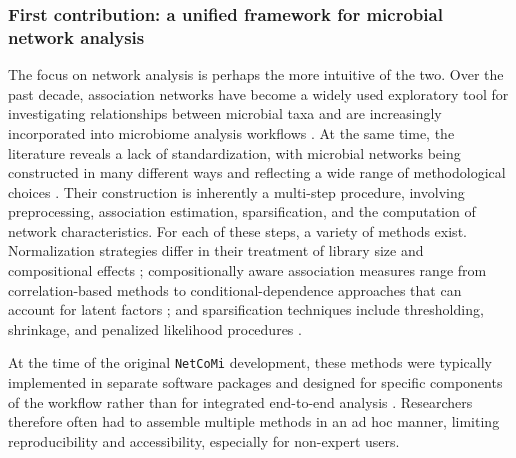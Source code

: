 \subsubsection*{First contribution: a unified framework for microbial network analysis}
The focus on network analysis is perhaps the more intuitive of the two. 
Over the past decade, association networks have become a widely used exploratory tool for investigating relationships between microbial taxa and are increasingly incorporated into microbiome analysis workflows \citep{faust2021open}. 
At the same time, the literature reveals a lack of standardization, with microbial networks being constructed in many different ways and reflecting a wide range of methodological choices \citep{weiss2017normalization, kurtz2015sparse, ullmann2023overoptimism}. 
Their construction is inherently a multi-step procedure, involving preprocessing, association estimation, sparsification, and the computation of network characteristics. 
For each of these steps, a variety of methods exist.
Normalization strategies differ in their treatment of library size and compositional effects \citep{mcmurdie2014waste,mcknight2019methods,badri2020shrinkage}; compositionally aware association measures range from correlation-based methods to conditional-dependence approaches that can account for latent factors \citep{friedman2012inferring,quinn2017propr,kurtz2015sparse,kurtz2019disentangling}; and sparsification techniques include thresholding, shrinkage, and penalized likelihood procedures \citep{schafer2005shrinkage,meinshausen2006highdimensional,friedman2008sparse}. 

At the time of the original \texttt{NetCoMi} development, these methods were typically implemented in separate software packages and designed for specific components of the workflow rather than for integrated end-to-end analysis \citep{peschel2021netcomi}. Researchers therefore often had to assemble multiple methods in an ad hoc manner, limiting reproducibility and accessibility, especially for non-expert users.


